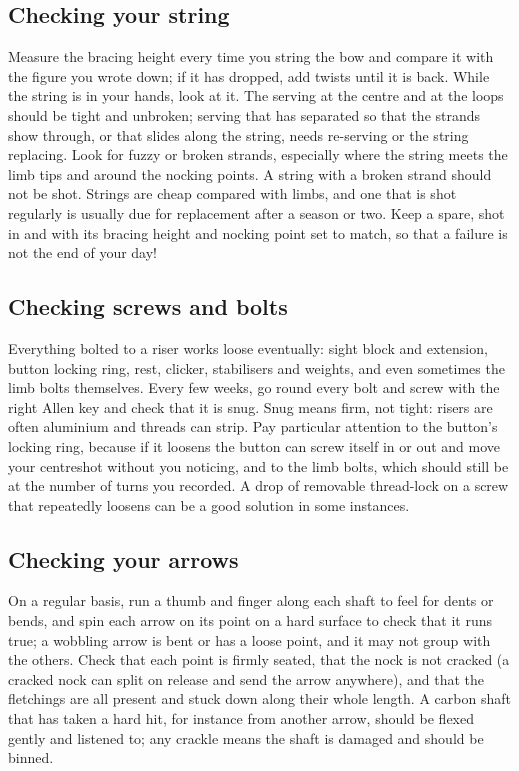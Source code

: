 \documentclass[11pt]{article}
\let\plainsubsection\subsection
\renewcommand{\subsection}{\FloatBarrier\plainsubsection}
\begin{document}
\subsection{Checking your string}
Measure the bracing height every time you string the bow and compare it with the figure you wrote down; if it has dropped, add twists until it is back. While the string is in your hands, look at it. The serving at the centre and at the loops should be tight and unbroken; serving that has separated so that the strands show through, or that slides along the string, needs re-serving or the string replacing. Look for fuzzy or broken strands, especially where the string meets the limb tips and around the nocking points. A string with a broken strand should not be shot. Strings are cheap compared with limbs, and one that is shot regularly is usually due for replacement after a season or two. Keep a spare, shot in and with its bracing height and nocking point set to match, so that a failure is not the end of your day!

\subsection{Checking screws and bolts}
Everything bolted to a riser works loose eventually: sight block and extension, button locking ring, rest, clicker, stabilisers and weights, and even sometimes the limb bolts themselves. Every few weeks, go round every bolt and screw with the right Allen key and check that it is snug. Snug means firm, not tight: risers are often aluminium and threads can strip. Pay particular attention to the button's locking ring, because if it loosens the button can screw itself in or out and move your centreshot without you noticing, and to the limb bolts, which should still be at the number of turns you recorded. A drop of removable thread-lock on a screw that repeatedly loosens can be a good solution in some instances.

\subsection{Checking your arrows}
On a regular basis, run a thumb and finger along each shaft to feel for dents or bends, and spin each arrow on its point on a hard surface to check that it runs true; a wobbling arrow is bent or has a loose point, and it may not group with the others. Check that each point is firmly seated, that the nock is not cracked (a cracked nock can split on release and send the arrow anywhere), and that the fletchings are all present and stuck down along their whole length. A carbon shaft that has taken a hard hit, for instance from another arrow, should be flexed gently and listened to; any crackle means the shaft is damaged and should be binned.
\end{document}
